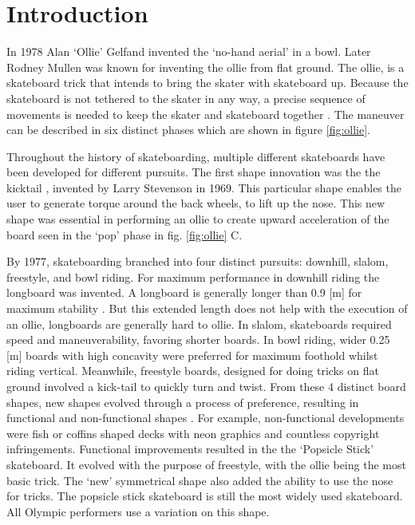 
\section{Introduction}\label{s_intro}

In 1978 Alan `Ollie' Gelfand invented the `no-hand aerial' in a bowl. Later Rodney Mullen was known for inventing the ollie from flat ground. The ollie, is a skateboard trick that intends to bring the skater with skateboard up. Because the skateboard is not tethered to the skater in any way, a precise sequence of movements is needed to keep the skater and skateboard together \cite{frederick_biomechanics_2006}. The maneuver can be described in six distinct phases which are shown in figure \ref{fig:ollie}. 

Throughout the history of skateboarding, multiple different skateboards have been developed for different pursuits. The first shape innovation was the the kicktail \cite{stevenson_skateboard_1971}, invented by Larry Stevenson in 1969. This particular shape enables the user to generate torque around the back wheels, to lift up the nose. This new shape was essential in performing an ollie to create upward acceleration of the board seen in the `pop' phase in fig. \ref{fig:ollie} C. 

By 1977, skateboarding branched into four distinct pursuits: downhill, slalom, freestyle, and bowl riding. For maximum performance in downhill riding the longboard was invented. A longboard is generally longer than 0.9 [m] for maximum stability \cite{prentiss_get_2011}. But this extended length does not help with the execution of an ollie, longboards are generally hard to ollie. In slalom, skateboards required speed and maneuverability, favoring shorter boards. In bowl riding, wider 0.25 [m] boards with high concavity were preferred for maximum foothold whilst riding vertical. Meanwhile, freestyle boards, designed for doing tricks on flat ground involved a kick-tail to quickly turn and twist. From these 4 distinct board shapes, new shapes evolved through a process of preference, resulting in functional and non-functional shapes \cite{prentiss_get_2011}. For example, non-functional developments were fish or coffins shaped decks with neon graphics and countless copyright infringements. Functional improvements resulted in the the `Popsicle Stick' skateboard. It evolved with the purpose of freestyle, with the ollie being the most basic trick. The `new' symmetrical shape also added the ability to use the nose for tricks. The popsicle stick skateboard is still the most widely used skateboard. All Olympic performers use a variation on this shape. 

